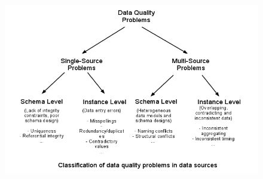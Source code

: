 \begin{figure}[H]
\begin{center}
 \includegraphics[scale=0.5]{ClassificationData.png}
  \caption{}
\end{center}  
\end{figure}

